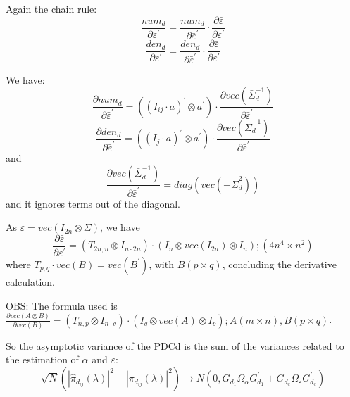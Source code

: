 \documentclass[a4paper,10pt]{article}
\begin{document}
Again the chain rule:
\begin{equation}
\frac{num_{d}}{\partial \varepsilon^{'}} = \frac{num_{d}}{\partial \bar{\varepsilon}^{'}} \cdot \frac{\partial \bar{\varepsilon}}{\partial \varepsilon^{'}}
\end{equation}
\begin{equation}
\frac{den_{d}}{\partial \varepsilon^{'}} = \frac{den_{d}}{\partial \bar{\varepsilon}^{'}} \cdot \frac{\partial \bar{\varepsilon}}{\partial \varepsilon^{'}}
\end{equation}

We have:
\begin{equation}
\frac{\partial num_{d}}{\partial \bar{\varepsilon}^{'}} = ((I_{ij} \cdot a)^{'} \otimes a^{'}) \cdot \frac{\partial vec(\bar{\Sigma}_{d}^{-1})}{\partial \bar{\varepsilon}^{'}}
\end{equation}
\begin{equation}
\frac{\partial den_{d}}{\partial \bar{\varepsilon}^{'}} = ((I_{j} \cdot a)^{'} \otimes a^{'}) \cdot \frac{\partial vec(\bar{\Sigma}_{d}^{-1})}{\partial \bar{\varepsilon}^{'}}
\end{equation}
and
\begin{equation}
\frac{\partial vec(\bar{\Sigma}_{d}^{-1})}{\partial \bar{\varepsilon}^{'}} = diag(vec(-\bar{\Sigma}_{d}^{2}))
\end{equation}
and it ignores terms out of the diagonal.

As $\bar{\varepsilon} = vec(I_{2n} \otimes \Sigma)$, we have
\begin{equation}
\frac{\partial \bar{\varepsilon}}{\partial \varepsilon^{'}} = (T_{2n,n} \otimes I_{n \cdot 2n}) \cdot (I_{n} \otimes vec(I_{2n}) \otimes I_{n}); (4n^{4} \times n^{2})
\end{equation}
where $T_{p,q} \cdot vec(B) = vec(B^{'})$, with $B (p \times q)$, concluding the derivative calculation.

OBS: The formula used is $\frac{\partial vec(A \otimes B)}{\partial vec(B)} = (T_{n,p} \otimes I_{n \cdot q}) \cdot (I_{q} \otimes vec(A) \otimes I_{p}); A (m \times n), B (p \times q)$.

So the asymptotic variance of the PDCd is the sum of the variances related to the estimation of $\alpha$ and $\varepsilon$:
\begin{equation}
\sqrt{N} (|\hat{\pi}_{d_{ij}}(\lambda)|^{2} - |\pi_{d_{ij}}(\lambda)|^{2}) \to N(0, G_{d_1} \Omega_{\alpha} G_{d_1}^{'} + G_{d_e} \Omega_{\varepsilon} G_{d_e}^{'}) 
\end{equation}
\end{document}
